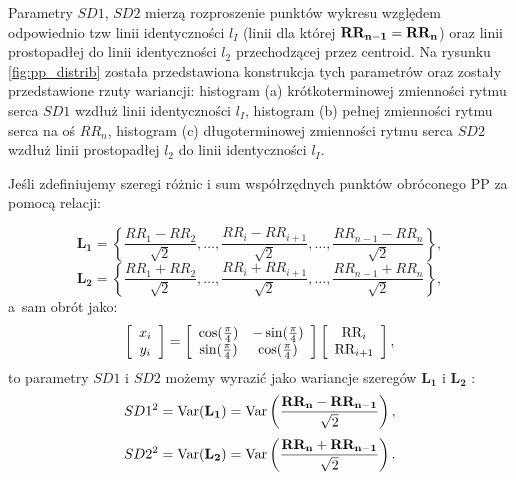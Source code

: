 
Parametry $SD1$, $SD2$ mierzą rozproszenie punktów wykresu
\PP{} względem odpowiednio tzw linii identyczności $l_{I}$ (linii dla której $\mathbf{RR_{n-1}} = \mathbf{RR_n}$)
oraz linii prostopadłej do linii identyczności $l_2$ przechodzącej przez centroid. Na
rysunku \ref{fig:pp_distrib} została przedstawiona konstrukcja tych parametrów oraz zostały
przedstawione rzuty wariancji: histogram (a) krótkoterminowej zmienności rytmu serca $SD1$
wzdłuż linii identyczności $l_{I}$, histogram (b) pełnej zmienności rytmu serca na oś $RR_n$,
histogram (c) długoterminowej zmienności rytmu serca $SD2$ wzdłuż linii prostopadłej $l_2$
do linii identyczności $l_{I}$.

Jeśli zdefiniujemy szeregi różnic i sum współrzędnych punktów obróconego PP za pomocą
relacji:


\begin{equation}
\mathbf{L_1} = \left \{ \frac{RR_1 - RR_{2}}{\sqrt{2}}, \ldots, \frac{RR_i - RR_{i+1}}{\sqrt{2}}, \ldots, \frac{RR_{n-1} - RR_{n}}{\sqrt{2}} \right \},
\end{equation}
\begin{equation}
\mathbf{L_2} = \left \{\frac{RR_1 + RR_{2}}{\sqrt{2}}, \ldots, \frac{RR_i + RR_{i+1}}{\sqrt{2}}, \ldots, \frac{RR_{n-1} + RR_{n}}{\sqrt{2}} \right \},
\end{equation}
a~sam obrót jako:
\begin{equation}
\left[
    \begin{array}{c}
      x_i\\
      y_i\\
    \end{array} \right] 
  = 
\left[ \begin{array}{c c}
      \cos(\frac{\pi}{4}) & -\sin(\frac{\pi}{4})\\
      \sin(\frac{\pi}{4}) & \cos(\frac{\pi}{4})\\
    \end{array} \right] 
\left[
    \begin{array}{c}
      \mbox{RR}_i\\
      \mbox{RR}_{i+1}\\
    \end{array} \right],
\end{equation}
to parametry $SD1$ i $SD2$ możemy wyrazić jako wariancje szeregów $\mathbf{L_1}$ i $\mathbf{L_2}$ \cite{poinc_jaro,jarek2}:
\begin{equation}
  SD1^2 = \mbox{Var}( \mathbf{L_1})
  = \mbox{Var}\left(\frac{\mathbf{RR_n} - \mathbf{RR_{n-1}}}{\sqrt{2}}\right),
  \label{eq:sd1}
\end{equation}
\begin{equation}
  SD2^2 = \mbox{Var}( \mathbf{L_2})
  = \mbox{Var}\left(\frac{\mathbf{RR_n} + \mathbf{RR_{n-1}}}{\sqrt{2}}\right). 
  \label{eq:sd2}
\end{equation}

